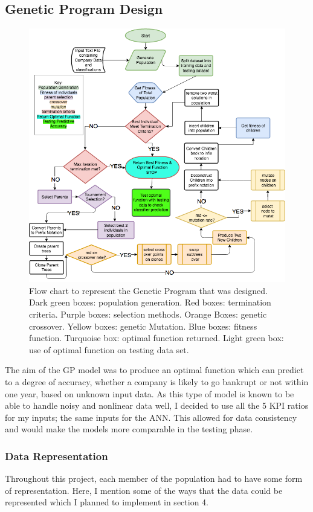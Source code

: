 \documentclass[11pt]{article}
\begin{document}
\subsection{Genetic Program Design}\label{subsec:gpDes}
\begin{figure}[h]
\centering
\includegraphics[scale = .55]{GPFlowReformat} 
\caption{Flow chart to represent the Genetic Program that was designed. Dark green boxes: population generation. Red boxes: termination criteria. Purple boxes: selection methods. Orange Boxes: genetic crossover. Yellow boxes: genetic Mutation. Blue boxes: fitness function. Turquoise box: optimal function returned. Light green box: use of optimal function on testing data set.} 
\end{figure}
The aim of the GP model was to produce an optimal function which can predict to a degree of accuracy, whether a company is likely to go bankrupt or not within one year, based on unknown input data. As this type of model is known to be able to handle noisy and nonlinear data well, I decided to use all the 5 KPI ratios for my inputs; the same inputs for the ANN. This allowed for data consistency and would make the models more comparable in the testing phase.
\subsubsection{Data Representation}\label{subsubsec:dataRep}
Throughout this project, each member of the population had to have some form of representation. Here, I mention some of the ways that the data could be represented which I planned to implement in section 4. 
\end{document}

